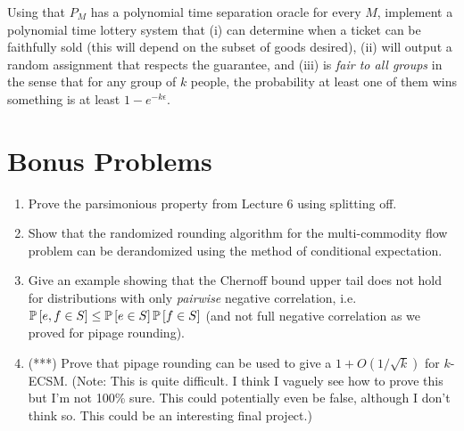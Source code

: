 Using that $P_M$ has a polynomial time separation oracle for every $M$, implement a polynomial time lottery system that (i) can determine when a ticket can be faithfully sold (this will depend on the subset of goods desired), (ii) will output a random assignment that respects the guarantee, and (iii) is \textit{fair to all groups} in the sense that for any group of $k$ people, the probability at least one of them wins something is at least $1-e^{-k\epsilon}$.

\section{Bonus Problems} 

\begin{enumerate}
	\item Prove the parsimonious property from Lecture 6 using splitting off. 
	\item Show that the randomized rounding algorithm for the multi-commodity flow problem can be derandomized using the method of conditional expectation.
	\item Give an example showing that the Chernoff bound upper tail does not hold for distributions with only \textit{pairwise} negative correlation, i.e. $\P{e,f \in S} \le \P{e \in S}\P{f \in S}$ (and not full negative correlation as we proved for pipage rounding).
	\item (***) Prove that pipage rounding can be used to give a  $1+O(1/\sqrt{k})$ for $k$-ECSM. (Note: This is quite difficult. I think I vaguely see how to prove this but I'm not 100\% sure. This could potentially even be false, although I don't think so. This could be an interesting final project.)
\end{enumerate}

